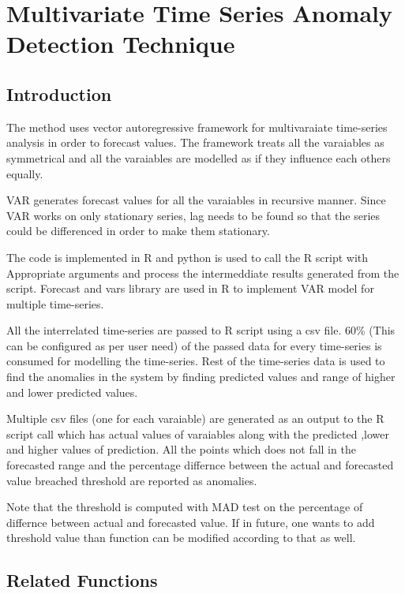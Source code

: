 \chapter{Multivariate Time Series Anomaly Detection Technique}

\section{Introduction}

The method uses vector autoregressive framework for multivaraiate time-series analysis
in order to forecast values. The framework treats all the varaiables as symmetrical
and all the varaiables are modelled as if they influence each others equally.

VAR generates forecast values for all the varaiables in recursive manner. Since VAR 
works on only stationary series, lag needs to be found so that the series could be
differenced in order to make them stationary.

The code is implemented in R and python is used to call the R script with Appropriate 
arguments and process the intermeddiate results generated from the script. Forecast and 
vars library are used in R to implement VAR model for multiple time-series.

All the interrelated time-series are passed to R script using a csv file. 60\% 
(This can be configured as per user need) of the passed data for every time-series 
is consumed for modelling the time-series. Rest of the time-series data is used to 
find the anomalies in the system by finding predicted values and range of higher and lower
predicted values.

Multiple csv files (one for each varaiable) are generated as an output to the R script 
call which has actual values of varaiables along with the predicted ,lower and higher 
values of prediction. All the points which does not fall in the forecasted range and 
the percentage differnce between the actual and forecasted value breached threshold 
are reported as anomalies.

Note that the threshold is computed with MAD test on the percentage of differnce between actual and forecasted value.
If in future, one wants to add threshold value than function can be modified according to that as well.

\section{Related Functions}

